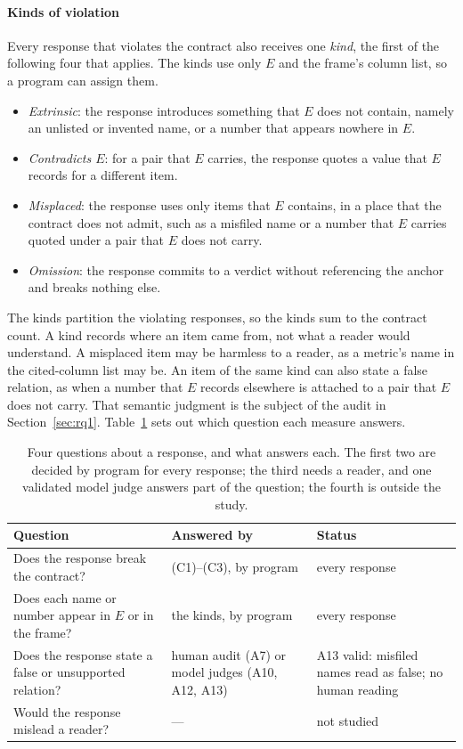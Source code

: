 \documentclass[10pt,twocolumn]{article}
\begin{document}
\paragraph{Kinds of violation}
Every response that violates the contract also receives one \emph{kind}, the
first of the following four that applies. The kinds use only $E$ and the
frame's column list, so a program can assign them.
\begin{itemize}
\item \emph{Extrinsic}: the response introduces something that $E$ does not
contain, namely an unlisted or invented name, or a number that appears nowhere
in $E$.
\item \emph{Contradicts $E$}: for a pair that $E$ carries, the response quotes
a value that $E$ records for a different item.
\item \emph{Misplaced}: the response uses only items that $E$ contains, in a
place that the contract does not admit, such as a misfiled name or a number
that $E$ carries quoted under a pair that $E$ does not carry.
\item \emph{Omission}: the response commits to a verdict without referencing
the anchor and breaks nothing else.
\end{itemize}
The kinds partition the violating responses, so the kinds sum to the contract
count. A kind records where an item came from, not what a reader would
understand. A misplaced item may be harmless to a reader, as a metric's name in
the cited-column list may be. An item of the same kind can also state a
false relation, as when a number that $E$ records elsewhere is attached to a
pair that $E$ does not carry. That semantic judgment is the subject of the audit in
Section~\ref{sec:rq1}.
Table~\ref{tab:questions} sets out which question each measure answers.

\begin{table}[!htbp]
\caption{Four questions about a response, and what answers each. The first
two are decided by program for every response; the third needs a reader, and
one validated model judge answers part of the question; the fourth is outside
the study.}
\label{tab:questions}
\centering
\footnotesize
\setlength{\tabcolsep}{3pt}
\begin{tabular}{@{}p{3.45cm}p{2.7cm}p{2.0cm}@{}}
\toprule
Question & Answered by & Status \\
\midrule
Does the response break the contract? & (C1)--(C3), by program & every response \\
Does each name or number appear in $E$ or in the frame? & the kinds, by program & every response \\
Does the response state a false or unsupported relation? & human audit (A7) or model judges (A10, A12, A13) & A13 valid: misfiled names read as false; no human reading \\
Would the response mislead a reader? & --- & not studied \\
\bottomrule
\end{tabular}
\end{table}
\end{document}
